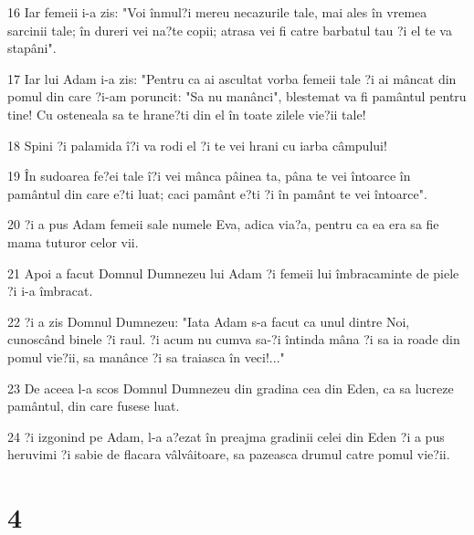\par 16 Iar femeii i-a zis: "Voi înmul?i mereu necazurile tale, mai ales în vremea sarcinii tale; în dureri vei na?te copii; atrasa vei fi catre barbatul tau ?i el te va stapâni".
\par 17 Iar lui Adam i-a zis: "Pentru ca ai ascultat vorba femeii tale ?i ai mâncat din pomul din care ?i-am poruncit: "Sa nu manânci", blestemat va fi pamântul pentru tine! Cu osteneala sa te hrane?ti din el în toate zilele vie?ii tale!
\par 18 Spini ?i palamida î?i va rodi el ?i te vei hrani cu iarba câmpului!
\par 19 În sudoarea fe?ei tale î?i vei mânca pâinea ta, pâna te vei întoarce în pamântul din care e?ti luat; caci pamânt e?ti ?i în pamânt te vei întoarce".
\par 20 ?i a pus Adam femeii sale numele Eva, adica via?a, pentru ca ea era sa fie mama tuturor celor vii.
\par 21 Apoi a facut Domnul Dumnezeu lui Adam ?i femeii lui îmbracaminte de piele ?i i-a îmbracat.
\par 22 ?i a zis Domnul Dumnezeu: "Iata Adam s-a facut ca unul dintre Noi, cunoscând binele ?i raul. ?i acum nu cumva sa-?i întinda mâna ?i sa ia roade din pomul vie?ii, sa manânce ?i sa traiasca în veci!..."
\par 23 De aceea l-a scos Domnul Dumnezeu din gradina cea din Eden, ca sa lucreze pamântul, din care fusese luat.
\par 24 ?i izgonind pe Adam, l-a a?ezat în preajma gradinii celei din Eden ?i a pus heruvimi ?i sabie de flacara vâlvâitoare, sa pazeasca drumul catre pomul vie?ii.

\chapter{4}

